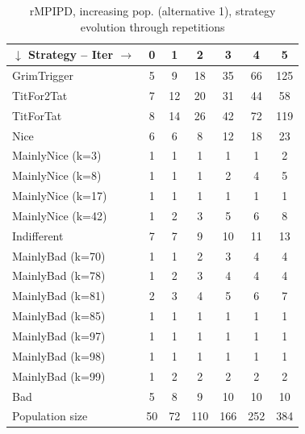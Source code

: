 \documentclass[journal,a4paper,10pt,twoside]{IEEEtran} %
\begin{document}
\begin{table}[ht]
	\caption{rMPIPD, increasing pop. (alternative 1), strategy evolution through repetitions}
	\label{tab:ripdmp-incr}
	\centering
	\begin{tabular}{l|cccccc} \toprule
		$\downarrow$ Strategy -- Iter $\rightarrow$ & 0 & 1 & 2 & 3 & 4 & 5 \\ \midrule
		GrimTrigger       &  5 &   9 &  18 &  35 &  66 &  125 \\
		TitFor2Tat        &  7 &  12 &  20 &  31 &  44 &   58 \\
		TitForTat         &  8 &  14 &  26 &  42 &  72 &  119 \\
		Nice              &  6 &   6 &   8 &  12 &  18 &   23 \\
		MainlyNice (k=3)  &  1 &   1 &   1 &   1 &   1 &    2 \\
		MainlyNice (k=8)  &  1 &   1 &   1 &   2 &   4 &    5 \\
		MainlyNice (k=17) &  1 &   1 &   1 &   1 &   1 &    1 \\
		MainlyNice (k=42) &  1 &   2 &   3 &   5 &   6 &    8 \\
		Indifferent       &  7 &   7 &   9 &  10 &  11 &   13 \\
		MainlyBad (k=70)  &  1 &   1 &   2 &   3 &   4 &    4 \\
		MainlyBad (k=78)  &  1 &   2 &   3 &   4 &   4 &    4 \\
		MainlyBad (k=81)  &  2 &   3 &   4 &   5 &   6 &    7 \\
		MainlyBad (k=85)  &  1 &   1 &   1 &   1 &   1 &    1 \\
		MainlyBad (k=97)  &  1 &   1 &   1 &   1 &   1 &    1 \\
		MainlyBad (k=98)  &  1 &   1 &   1 &   1 &   1 &    1 \\
		MainlyBad (k=99)  &  1 &   2 &   2 &   2 &   2 &    2 \\
		Bad               &  5 &   8 &   9 &  10 &  10 &   10 \\ \midrule
		Population size   & 50 &  72 & 110 & 166 & 252 &  384 \\ \bottomrule
	\end{tabular}
\end{table}
\end{document}
